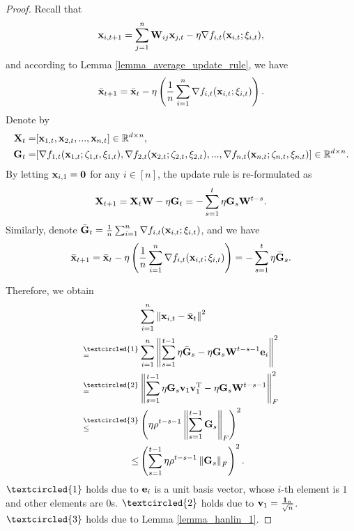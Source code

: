 \documentclass{article}
\begin{document}
\begin{proof}


Recall that 
\begin{align}
\nonumber
{\bf x}_{i,t+1} = \sum_{j=1}^n {\bf W}_{ij}{\bf x}_{j,t} - \eta \nabla f_{i,t}({\bf x}_{i,t};\xi_{i,t}), 
\end{align} and according to Lemma \ref{lemma_average_update_rule}, we have 
\begin{align}
\nonumber
\bar{{\bf x}}_{t+1} = \bar{{\bf x}}_t - \eta \left( \frac{1}{n}\sum_{i=1}^n \nabla f_{i,t}({\bf x}_{i,t};\xi_{i,t}) \right).
\end{align} Denote by
\begin{align}
\nonumber
{\bf X}_t = &  [{\bf x}_{1,t}, {\bf x}_{2,t}, ..., {\bf x}_{n,t}] \in \mathbb{R}^{d\times n}, \\ \nonumber
{\bf G}_t = & [\nabla f_{1,t}({\bf x}_{1,t};\zeta_{1,t},\xi_{1,t}), \nabla f_{2,t}({\bf x}_{2,t};\zeta_{2,t},\xi_{2,t}), ..., \nabla f_{n,t}({\bf x}_{n,t};\zeta_{n,t},\xi_{n,t})] \in \mathbb{R}^{d\times n}.
\end{align} By letting ${\bf x}_{i,1} = {\bf 0}$ for any $i\in[n]$, the update rule is re-formulated as 
\begin{align}
\nonumber
{\bf X}_{t+1} = {\bf X}_t {\bf W} - \eta {\bf G}_t = - \sum_{s=1}^t \eta {\bf G}_s {\bf W}^{t-s}. 
\end{align} Similarly, denote $\bar{{\bf G}}_t = \frac{1}{n}\sum_{i=1}^n \nabla f_{i,t}({\bf x}_{i,t};\xi_{i,t})$, and we have
\begin{align*}
\bar{{\bf x}}_{t+1} = \bar{{\bf x}}_t - \eta \left( \frac{1}{n}\sum_{i=1}^n \nabla f_{i,t}({\bf x}_{i,t};\xi_{i,t}) \right) = - \sum_{s=1}^t \eta \bar{{\bf G}}_s. 
\end{align*}

Therefore, we obtain
\begin{align}
\nonumber
& \sum_{i=1}^n \lrnorm{\x_{i,t} - \bar{\x}_t}^2 \\ \nonumber
\refabovecir{=}{\textcircled{1}} & \sum_{i=1}^n \lrnorm{ \sum_{s=1}^{t-1} \eta \bar{\G}_s - \eta \G_s \W^{t-s-1}\e_i }^2   \\ \nonumber
\refabovecir{=}{\textcircled{2}} & \lrnorm{ \sum_{s=1}^{t-1} \eta \G_s\v_1 \v_1\Tr - \eta \G_s \W^{t-s-1} }^2_F   \\ \nonumber
\refabovecir{\le}{\textcircled{3}} & \lrincir{ \eta \rho^{t-s-1} \lrnorm{\sum_{s=1}^{t-1}\G_s}_F}^2 \\ \nonumber
\le & \lrincir{ \sum_{s=1}^{t-1} \eta \rho^{t-s-1} \lrnorm{\G_s}_F}^2.
\end{align} $\textcircled{1}$ holds due to ${\bf e}_i$ is a unit basis vector, whose $i$-th element is $1$ and other elements are $0$s. $\textcircled{2}$ holds due to ${\bf v}_1 = \frac{{\bf 1}_n}{\sqrt{n}}$. $\textcircled{3}$ holds due to Lemma \ref{lemma_hanlin_1}. 



\end{proof}
\end{document}
